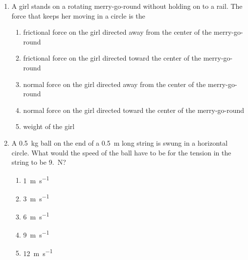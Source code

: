 \documentclass{../../../oss-apphys}
\begin{document}
\genheader


\genmultidirections

\gengravity

\raggedcolumns
\begin{multicols}{2}
  \begin{enumerate}[leftmargin=18pt]

  \item A girl stands on a rotating merry-go-round without holding on to a rail.
    The force that keeps her moving in a circle is the
    \begin{enumerate}[noitemsep,topsep=0pt,leftmargin=18pt,label=(\Alph*)]
    \item frictional force on the girl directed away from the center of the
      merry-go-round
    \item frictional force on the girl directed toward the center of the
      merry-go-round
    \item normal force on the girl directed away from the center of the
      merry-go-round
    \item normal force on the girl directed toward the center of the
      merry-go-round
    \item weight of the girl
    \end{enumerate}

  \item A \SI{.5}{\kilo\gram} ball on the end of a \SI{.5}{\metre} long string
    is swung in a horizontal circle. What would the speed of the ball have to
    be for the tension in the string to be \SI{9.}{\newton}?
    \begin{center}
      \vspace{-.1in}
    \end{center}
    \begin{enumerate}[noitemsep,topsep=0pt,leftmargin=18pt,label=(\Alph*)]
    \item\SI{1}{\metre\per\second}
    \item\SI{3}{\metre\per\second}
    \item\SI{6}{\metre\per\second}
    \item\SI{9}{\metre\per\second}
    \item\SI{12}{\metre\per\second}
    \end{enumerate}
    \columnbreak
    

\end{enumerate}
\end{multicols}
\end{document}
